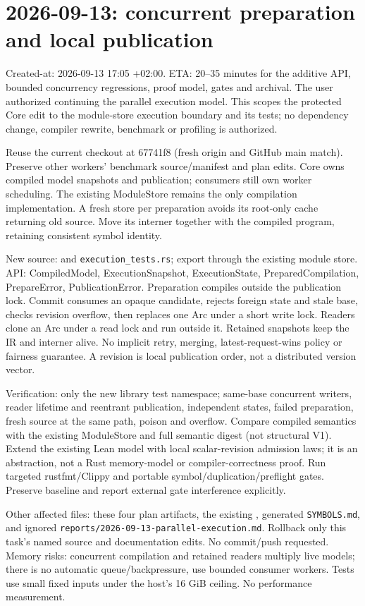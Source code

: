 \documentclass[11pt,a4paper]{article}
\begin{document}
\section*{2026-09-13: concurrent preparation and local publication}
Created-at: 2026-09-13 17:05 +02:00. ETA: 20--35 minutes for the additive
API, bounded concurrency regressions, proof model, gates and archival.
The user authorized continuing the parallel execution model. This scopes the
protected Core edit to the module-store execution boundary and its tests; no
dependency change, compiler rewrite, benchmark or profiling is authorized.

Reuse the current checkout at 67741f8 (fresh origin and GitHub main match).
Preserve other workers' benchmark source/manifest and plan edits. Core owns
compiled model snapshots and publication; consumers still own worker scheduling.
The existing ModuleStore remains the only compilation implementation. A fresh
store per preparation avoids its root-only cache returning old source. Move its
interner together with the compiled program, retaining consistent symbol identity.

New source:  and
\texttt{execution\_tests.rs}; export through the existing module store.
API: CompiledModel, ExecutionSnapshot, ExecutionState, PreparedCompilation,
PrepareError, PublicationError. Preparation compiles outside the publication lock.
Commit consumes an opaque candidate, rejects foreign state and stale base, checks
revision overflow, then replaces one Arc under a short write lock. Readers clone
an Arc under a read lock and run outside it. Retained snapshots keep the IR and
interner alive. No implicit retry, merging, latest-request-wins policy or fairness
guarantee. A revision is local publication order, not a distributed version vector.

Verification: only the new library test namespace; same-base concurrent writers,
reader lifetime and reentrant publication, independent states, failed preparation,
fresh source at the same path, poison and overflow. Compare compiled semantics
with the existing ModuleStore and full semantic digest (not structural V1).
Extend the existing Lean model with local scalar-revision admission laws; it is
an abstraction, not a Rust memory-model or compiler-correctness proof.
Run targeted rustfmt/Clippy and portable symbol/duplication/preflight gates.
Preserve baseline and report external gate interference explicitly.

Other affected files: these four plan artifacts, the existing
, generated
\texttt{SYMBOLS.md}, and ignored
\texttt{reports/2026-09-13-parallel-execution.md}. Rollback only this task's
named source and documentation edits. No commit/push requested.
Memory risks: concurrent compilation and retained readers multiply live models;
there is no automatic queue/backpressure, use bounded consumer workers. Tests use
small fixed inputs under the host's 16 GiB ceiling. No performance measurement.


\end{document}
